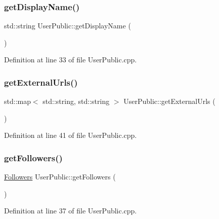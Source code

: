 \subsubsection{\texorpdfstring{get\+Display\+Name()}{getDisplayName()}}
{\footnotesize\ttfamily std\+::string User\+Public\+::get\+Display\+Name (\begin{DoxyParamCaption}{ }\end{DoxyParamCaption})}



Definition at line 33 of file User\+Public.\+cpp.

\mbox{\label{class_user_public_a377b6b1564d785656386225d5ba6be0a}} 
\subsubsection{\texorpdfstring{get\+External\+Urls()}{getExternalUrls()}}
{\footnotesize\ttfamily std\+::map$<$ std\+::string, std\+::string $>$ User\+Public\+::get\+External\+Urls (\begin{DoxyParamCaption}{ }\end{DoxyParamCaption})}



Definition at line 41 of file User\+Public.\+cpp.

\mbox{\label{class_user_public_a67438a95a75f06f86616eb25d3e4f254}} 
\subsubsection{\texorpdfstring{get\+Followers()}{getFollowers()}}
{\footnotesize\ttfamily \mbox{\hyperlink{class_followers}{Followers}} User\+Public\+::get\+Followers (\begin{DoxyParamCaption}{ }\end{DoxyParamCaption})}



Definition at line 37 of file User\+Public.\+cpp.

\mbox{\label{class_user_public_aaf900e9b9d4ceb7da738fa66123bec32}} 
